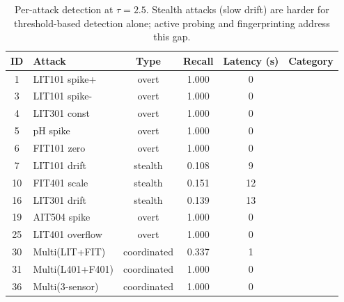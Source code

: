 \begin{table}[t]
\centering
\caption{Per-attack detection at $\tau = 2.5$. Stealth attacks (slow drift) are harder for threshold-based detection alone; active probing and fingerprinting address this gap.}
\label{tab:per_attack}
\begin{tabular}{clcccc}
\toprule
ID & Attack & Type & Recall & Latency (s) & Category \\
\midrule
1 & LIT101 spike+ & overt & 1.000 & 0 \\
3 & LIT101 spike- & overt & 1.000 & 0 \\
4 & LIT301 const & overt & 1.000 & 0 \\
5 & pH spike & overt & 1.000 & 0 \\
6 & FIT101 zero & overt & 1.000 & 0 \\
7 & LIT101 drift & stealth & 0.108 & 9 \\
10 & FIT401 scale & stealth & 0.151 & 12 \\
16 & LIT301 drift & stealth & 0.139 & 13 \\
19 & AIT504 spike & overt & 1.000 & 0 \\
25 & LIT401 overflow & overt & 1.000 & 0 \\
30 & Multi(LIT+FIT) & coordinated & 0.337 & 1 \\
31 & Multi(L401+F401) & coordinated & 1.000 & 0 \\
36 & Multi(3-sensor) & coordinated & 1.000 & 0 \\
\bottomrule
\end{tabular}
\end{table}
